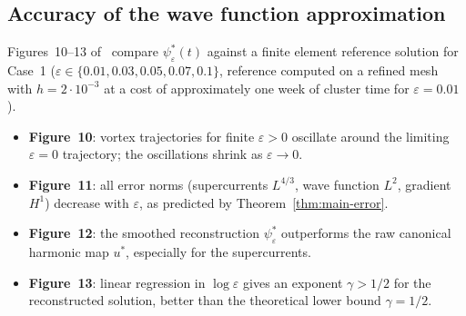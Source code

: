 \documentclass[12pt, a4paper]{article}
\theoremstyle{plain}
\theoremstyle{definition}
\newcommand{\psistar}{\psi^*_\varepsilon}
\begin{document}
\subsection{Accuracy of the wave function approximation}

Figures~10--13 of~\cite{CorsoKemlinMelcherStamm2024}
compare $\psistar(t)$ against a finite element reference solution
for Case~1 ($\varepsilon \in \{0.01, 0.03, 0.05, 0.07, 0.1\}$,
reference computed on a refined mesh with $h = 2\cdot 10^{-3}$
at a cost of approximately one week of cluster time for $\varepsilon = 0.01$).

\begin{itemize}
  \item \textbf{Figure~10}: vortex trajectories for finite $\varepsilon > 0$
        oscillate around the limiting $\varepsilon = 0$ trajectory;
        the oscillations shrink as $\varepsilon \to 0$.
  \item \textbf{Figure~11}: all error norms
        (supercurrents $L^{4/3}$, wave function $L^2$, gradient $H^1$)
        decrease with $\varepsilon$, as predicted by Theorem~\ref{thm:main-error}.
  \item \textbf{Figure~12}: the smoothed reconstruction $\psistar$
        outperforms the raw canonical harmonic map $u^*$,
        especially for the supercurrents.
  \item \textbf{Figure~13}: linear regression in $\log\varepsilon$ gives
        an exponent $\gamma > 1/2$ for the reconstructed solution,
        better than the theoretical lower bound $\gamma = 1/2$.
\end{itemize}

\newpage
\printbibliography
\end{document}
